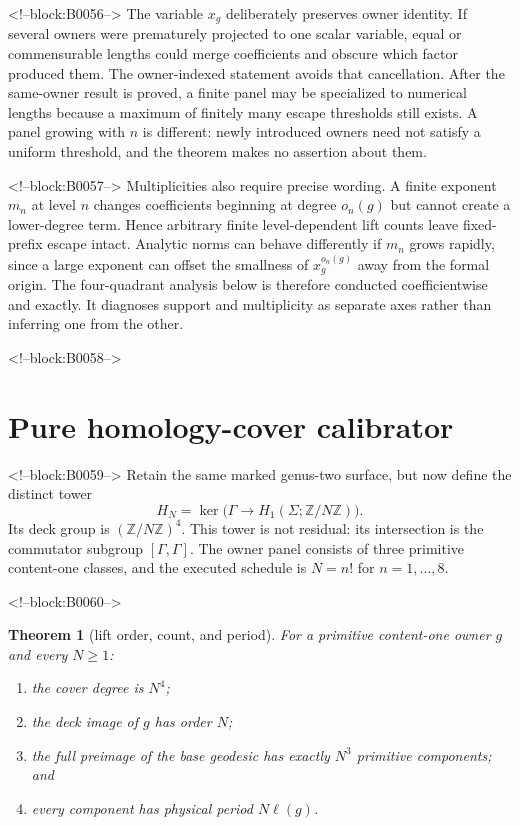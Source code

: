 \documentclass[11pt]{article}
\newtheorem{theorem}{Theorem}[section]
\theoremstyle{definition}
\theoremstyle{remark}
\newcommand{\ZZ}{\mathbb Z}
\begin{document}
<!--block:B0056-->
The variable $x_g$ deliberately preserves owner identity. If several owners were prematurely projected to one scalar variable, equal or commensurable lengths could merge coefficients and obscure which factor produced them. The owner-indexed statement avoids that cancellation. After the same-owner result is proved, a finite panel may be specialized to numerical lengths because a maximum of finitely many escape thresholds still exists. A panel growing with $n$ is different: newly introduced owners need not satisfy a uniform threshold, and the theorem makes no assertion about them.

<!--block:B0057-->
Multiplicities also require precise wording. A finite exponent $m_n$ at level $n$ changes coefficients beginning at degree $o_n(g)$ but cannot create a lower-degree term. Hence arbitrary finite level-dependent lift counts leave fixed-prefix escape intact. Analytic norms can behave differently if $m_n$ grows rapidly, since a large exponent can offset the smallness of $x_g^{o_n(g)}$ away from the formal origin. The four-quadrant analysis below is therefore conducted coefficientwise and exactly. It diagnoses support and multiplicity as separate axes rather than inferring one from the other.

<!--block:B0058-->
\section{Pure homology-cover calibrator}

<!--block:B0059-->
Retain the same marked genus-two surface, but now define the distinct tower
\[
H_N=\ker\bigl(\Gamma\to H_1(\Sigma;\ZZ/N\ZZ)\bigr).
\]
Its deck group is $(\ZZ/N\ZZ)^4$. This tower is not residual: its intersection is the commutator subgroup $[\Gamma,\Gamma]$. The owner panel consists of three primitive content-one classes, and the executed schedule is $N=n!$ for $n=1,\ldots,8$.

<!--block:B0060-->
\begin{theorem}[lift order, count, and period]\label{thm:lifts}
For a primitive content-one owner $g$ and every $N\geq1$:
\begin{enumerate}[label=(\roman*)]
\item the cover degree is $N^4$;
\item the deck image of $g$ has order $N$;
\item the full preimage of the base geodesic has exactly $N^3$ primitive components; and
\item every component has physical period $N\ell(g)$.
\end{enumerate}
\end{theorem}
\end{document}
